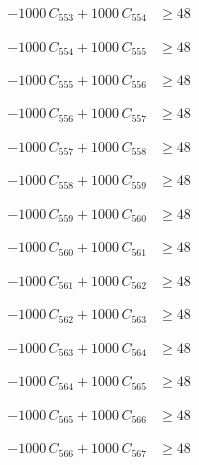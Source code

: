 \documentclass[a4paper,11pt]{article}
\begin{document}
\begin{align}
-1000\,C_{553} + 1000\,C_{554} &\geq 48 \nonumber
\end{align}

\begin{align}
-1000\,C_{554} + 1000\,C_{555} &\geq 48 \nonumber
\end{align}

\begin{align}
-1000\,C_{555} + 1000\,C_{556} &\geq 48 \nonumber
\end{align}

\begin{align}
-1000\,C_{556} + 1000\,C_{557} &\geq 48 \nonumber
\end{align}

\begin{align}
-1000\,C_{557} + 1000\,C_{558} &\geq 48 \nonumber
\end{align}

\begin{align}
-1000\,C_{558} + 1000\,C_{559} &\geq 48 \nonumber
\end{align}

\begin{align}
-1000\,C_{559} + 1000\,C_{560} &\geq 48 \nonumber
\end{align}

\begin{align}
-1000\,C_{560} + 1000\,C_{561} &\geq 48 \nonumber
\end{align}

\begin{align}
-1000\,C_{561} + 1000\,C_{562} &\geq 48 \nonumber
\end{align}

\begin{align}
-1000\,C_{562} + 1000\,C_{563} &\geq 48 \nonumber
\end{align}

\begin{align}
-1000\,C_{563} + 1000\,C_{564} &\geq 48 \nonumber
\end{align}

\begin{align}
-1000\,C_{564} + 1000\,C_{565} &\geq 48 \nonumber
\end{align}

\begin{align}
-1000\,C_{565} + 1000\,C_{566} &\geq 48 \nonumber
\end{align}

\begin{align}
-1000\,C_{566} + 1000\,C_{567} &\geq 48 \nonumber
\end{align}
\end{document}

